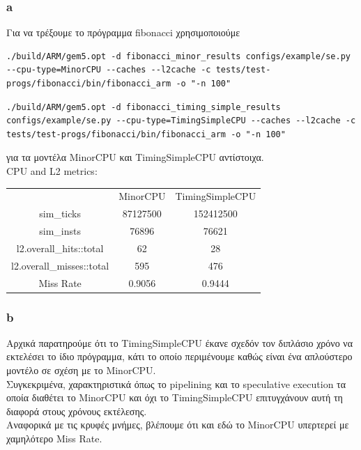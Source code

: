 \documentclass{article}
\begin{document}
\subsubsection{a}
Για να τρέξουμε το πρόγραμμα fibonacci χρησιμοποιούμε

\begin{lstlisting}
./build/ARM/gem5.opt -d fibonacci_minor_results configs/example/se.py --cpu-type=MinorCPU --caches --l2cache -c tests/test-progs/fibonacci/bin/fibonacci_arm -o "-n 100"
\end{lstlisting}

\begin{lstlisting}
./build/ARM/gem5.opt -d fibonacci_timing_simple_results configs/example/se.py --cpu-type=TimingSimpleCPU --caches --l2cache -c tests/test-progs/fibonacci/bin/fibonacci_arm -o "-n 100"
\end{lstlisting}

για τα μοντέλα MinorCPU και TimingSimpleCPU αντίστοιχα. \\

CPU and L2 metrics: \\

\begin{center}
\begin{tabular}{ |c|c|c| } 
 \hline
  & MinorCPU & TimingSimpleCPU\\
 sim\_ticks & 87127500 & 152412500\\
 sim\_insts & 76896 & 76621\\ 
 l2.overall\_hits::total & 62 & 28\\
 l2.overall\_misses::total & 595 & 476\\
 Miss Rate & 0.9056 & 0.9444\\
 \hline
\end{tabular}
\end{center}

\subsubsection{b}
Αρχικά παρατηρούμε ότι το TimingSimpleCPU έκανε σχεδόν τον διπλάσιο χρόνο να εκτελέσει το ίδιο πρόγραμμα, κάτι το οποίο περιμένουμε καθώς είναι ένα απλούστερο μοντέλο σε σχέση με το MinorCPU. \\
Συγκεκριμένα, χαρακτηριστικά όπως το pipelining και το speculative execution τα οποία διαθέτει το MinorCPU και όχι το TimingSimpleCPU επιτυγχάνουν αυτή τη διαφορά στους χρόνους εκτέλεσης. \\
Αναφορικά με τις κρυφές μνήμες, βλέπουμε ότι και εδώ το MinorCPU υπερτερεί με χαμηλότερο Miss Rate.\\
\end{document}
